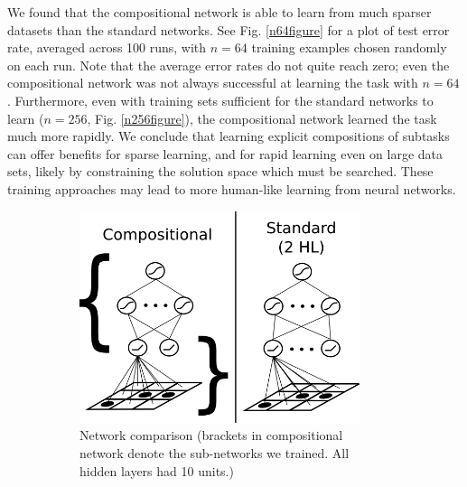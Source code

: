 \documentclass[10pt]{article}
\begin{document}
{We found that the compositional network is able to learn from much sparser datasets than the standard networks. See Fig. \ref{n64figure} for a plot of test error rate, averaged across 100 runs, with $n = 64$ training examples chosen randomly on each run. Note that the average error rates do not quite reach zero; even the compositional network was not always successful at learning the task with $n = 64$. Furthermore, even with training sets sufficient for the standard networks to learn ($n = 256$, Fig. \ref{n256figure}), the compositional network learned the task much more rapidly. We conclude that learning explicit compositions of subtasks can offer benefits for sparse learning, and for rapid learning even on large data sets, likely by constraining the solution space which must be searched. These training approaches may lead to more human-like learning from neural networks.
\begin{figure}[H]
    \centering
    \begin{subfigure}[c]{0.35\textwidth}
	\centering
	\includegraphics[width=0.9\textwidth]{figures/hierarchical_NN_abstract_figure.png}
	\caption{Network comparison (brackets in compositional network denote the sub-networks we trained. All hidden layers had 10 units.)}
	\label{networkdiagram}
    \end{subfigure}
    \begin{subfigure}[c]{0.3\textwidth}
	\centering

\end{subfigure}
\end{figure}}
\end{document}
